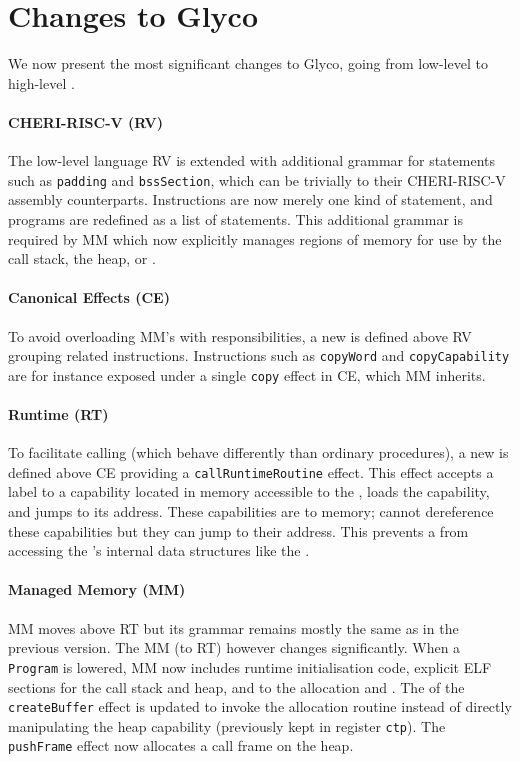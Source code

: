 \documentclass[main.tex]{subfiles}
\begin{document}
\section{Changes to Glyco} \label{sct:ghscc-changes}
We now present the most significant changes to Glyco, going from low-level to high-level .

\paragraph{CHERI-RISC-V (RV)} The low-level language RV is extended with additional grammar for statements such as \texttt{padding} and \texttt{bssSection}, which can be  trivially to their CHERI-RISC-V assembly counterparts. Instructions are now merely one kind of statement, and programs are redefined as a list of statements. This additional grammar is required by MM which now explicitly manages regions of memory for use by the call stack, the heap, or .

\paragraph{Canonical Effects (CE)} To avoid overloading MM's  with responsibilities, a new  is defined above RV grouping related instructions. Instructions such as \texttt{copyWord} and \texttt{copyCapability} are for instance exposed under a single \texttt{copy} effect in CE, which MM inherits.

\paragraph{Runtime (RT)} To facilitate calling  (which behave differently than ordinary procedures), a new  is defined above CE providing a \texttt{callRuntimeRoutine} effect. This effect accepts a label to a capability located in memory accessible to the , loads the capability, and jumps to its address. These capabilities are  to  memory;  cannot dereference these capabilities but they can jump to their address. This prevents a  from accessing the 's internal data structures like the .

\paragraph{Managed Memory (MM)} MM moves above RT but its grammar remains mostly the same as in the previous version. The MM (to RT)  however changes significantly. When a \texttt{Program} is lowered, MM now includes runtime initialisation code, explicit ELF sections for the call stack and heap, and  to the allocation and  . The  of the \texttt{createBuffer} effect is updated to invoke the allocation routine instead of directly manipulating the heap capability (previously kept in register \texttt{ctp}). The \texttt{pushFrame} effect now allocates a call frame on the heap.
\end{document}
